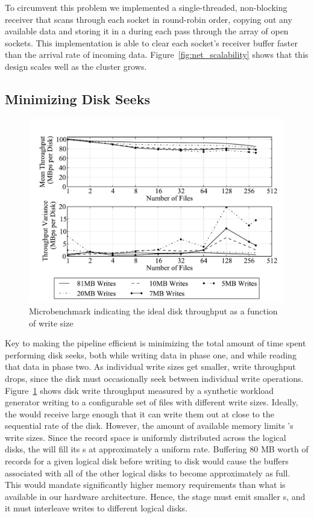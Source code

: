To circumvent this problem we implemented a single-threaded, non-blocking
receiver that scans through each socket in round-robin order, copying out any
available data and storing it in a \nodebuffer during each pass through the
array of open sockets.  This implementation is able to clear each socket's
receiver buffer faster than the arrival rate of incoming data.
Figure~\ref{fig:net_scalability} shows that this design scales well as the
cluster grows.

\subsection{Minimizing Disk Seeks}
\label{sec:diskseeks}

\begin{figure}
  \centering
  \includegraphics[width=\columnwidth]{tritonsort/graphs/write_scalability_throughput_receiverbench}
  \caption{\label{fig:micro_write_bw}Microbenchmark indicating the ideal disk throughput as a function of
           write size}
\end{figure}

Key to making the \tritonsort pipeline efficient is minimizing the total amount
of time spent performing disk seeks, both while writing data in phase one, and
while reading that data in phase two.  As individual write sizes get smaller,
write throughput drops, since the disk must occasionally seek between
individual write operations.  Figure~\ref{fig:micro_write_bw} shows disk write
throughput measured by a synthetic workload generator writing to a configurable
set of files with different write sizes.  Ideally, the \writer would receive
\writerbuffers large enough that it can write them out at close to the
sequential rate of the disk.  However, the amount of available memory limits
\tritonsort's write sizes.  Since the record space is uniformly distributed
across the logical disks, the \ldts will fill its \ldbuffer{}s at approximately
a uniform rate.  Buffering 80 MB worth of records for a given logical disk
before writing to disk would cause the buffers associated with all of the other
logical disks to become approximately as full.  This would mandate
significantly higher memory requirements than what is available in our hardware
architecture.  Hence, the \ldts stage must emit smaller \writerbuffer{}s, and
it must interleave writes to different logical disks.

